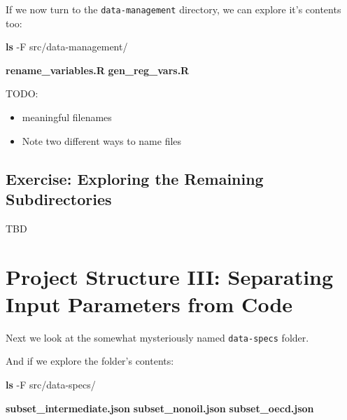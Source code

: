 \documentclass[]{book}
\newenvironment{Shaded}{\begin{snugshade}}{\end{snugshade}}
\newcommand{\KeywordTok}[1]{\textcolor[rgb]{0.13,0.29,0.53}{\textbf{{#1}}}}
\newcommand{\NormalTok}[1]{{#1}}
\providecommand{\tightlist}{%
  \setlength{\itemsep}{0pt}\setlength{\parskip}{0pt}}
\theoremstyle{definition}
\theoremstyle{definition}
\theoremstyle{definition}
\theoremstyle{remark}
\begin{document}
If we now turn to the \texttt{data-management} directory, we can explore
it's contents too:

\begin{Shaded}
\begin{Highlighting}[]
\KeywordTok{ls} \NormalTok{-F src/data-management/}
\end{Highlighting}
\end{Shaded}

\begin{Shaded}
\begin{Highlighting}[]
\KeywordTok{rename_variables.R}
\KeywordTok{gen_reg_vars.R}
\end{Highlighting}
\end{Shaded}

TODO:

\begin{itemize}
\tightlist
\item
  meaningful filenames
\item
  Note two different ways to name files
\end{itemize}

\subsection*{Exercise: Exploring the Remaining
Subdirectories}\label{exercise-exploring-the-remaining-subdirectories}

TBD

\section{Project Structure III: Separating Input Parameters from
Code}\label{project-structure-iii-separating-input-parameters-from-code}

Next we look at the somewhat mysteriously named \texttt{data-specs}
folder.

And if we explore the folder's contents:

\begin{Shaded}
\begin{Highlighting}[]
\KeywordTok{ls} \NormalTok{-F src/data-specs/}
\end{Highlighting}
\end{Shaded}

\begin{Shaded}
\begin{Highlighting}[]
\KeywordTok{subset_intermediate.json}
\KeywordTok{subset_nonoil.json}
\KeywordTok{subset_oecd.json}
\end{Highlighting}
\end{Shaded}
\end{document}
